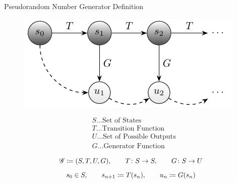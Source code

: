 \documentclass[aspectratio=169]{beamer}
\begin{document}
    \begin{frame}{Pseudorandom Number Generator Definition}
      \begin{minipage}[c]{0.49\textwidth}
        \begin{figure}
          \includegraphics[width=\textwidth]{figures/sequence_generation_scheme.pdf}
        \end{figure}
      \end{minipage}
      \begin{minipage}[c]{0.49\textwidth}
        \begin{align*}
          &S\ldots\text{Set of States}\\
          &T\ldots\text{Transition Function} \\
          &U\ldots\text{Set of Possible Outputs} \\
          &G\ldots\text{Generator Function}
        \end{align*}
      \end{minipage}
      \vfill
      \begin{mybox}
        \[
          \mathscr{G} \coloneqq (S,T,U,G),\qquad T\colon S\to S, \qquad G\colon S\to U
        \]
        \[
          s_0\in S, \qquad s_{n+1} \coloneqq T(s_n), \qquad u_n \coloneqq G(s_n)
        \]
      \end{mybox}
    \end{frame}
\end{document}
